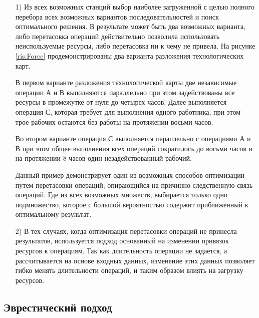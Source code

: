 \begin{itemize}
    \item[1)] Из всех возможных станций выбор наиболее загруженной с целью полного перебора всех возможных вариантов последовательностей и поиск оптимального решения. В результате может быть два возможных варианта, либо перетасовка операций действительно позволила использовать неиспользуемые ресурсы, либо перетасовка ни к чему не привела. На рисунке \ref{ris:Force} продемонстрированы два варианта разложения технологических карт. 
    
    В первом варианте разложения технологической карты две независимые операции А и В выполняются параллельно при этом задействованы все ресурсы в промежутке от нуля до четырех часов. Далее выполняется операция С, которая требует для выполнения одного работника, при этом трое рабочих остаются без работы на протяжении восьми часов.
    
    Во втором варианте операция С выполняется параллельно с операциями А и В при этом общее выполнения всех операций сократилось до восьми часов и на протяжении 8 часов один незадействованный рабочий.
    
    Данный пример демонстрирует один из возможных способов оптимизации путем перетасовки операций, опирающийся на причинно-следственную связь операций.  Где из всех возможных множеств, выбирается только одно подмножество, которое с большой вероятностью содержит приближенный к оптимальному результат.
    
    \item[2)] В тех случаях, когда оптимизация перетасовки операций не принесла результатов, используется подход основанный на изменении привязок ресурсов к операциям. Так как длительность операции не задается, а рассчитывается на основе входных данных, изменение этих данных позволяет гибко менять длительности операций, и таким образом влиять на загрузку ресурсов. 

\end{itemize}


\subsection{Эврестический подход}

